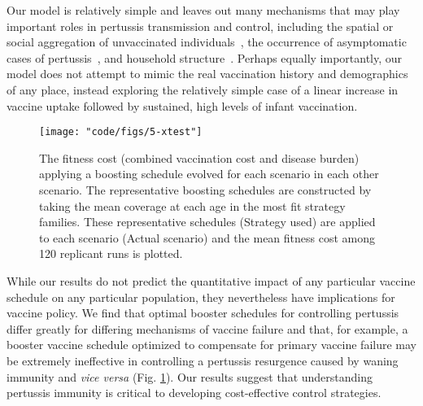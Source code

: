 \documentclass[12pt]{article}
\newcounter{lastnote}
\newenvironment{scilastnote}{%
\setcounter{lastnote}{\value{enumiv}}%
\addtocounter{lastnote}{+1}%
\begin{list}%
{\arabic{lastnote}.}
{\setlength{\leftmargin}{.22in}}
{\setlength{\labelsep}{.5em}}}
{\end{list}}
\begin{document}
Our model is relatively simple and leaves out many mechanisms
that may play important roles in pertussis transmission and control, including the
spatial or social aggregation of unvaccinated individuals~\cite{Omer:2009}, 
the occurrence of asymptomatic cases of pertussis~\cite{deGreeff_et:2010},
and household structure~\cite{deGreeff_et:2010}.
Perhaps equally importantly, our model does not attempt to mimic the real vaccination history and demographics
of any place, instead exploring the relatively simple case of a linear increase in vaccine uptake followed by sustained,
high levels of infant vaccination.


\begin{figure}[h!]
\texttt{[image: "code/figs/5-xtest"]}
\caption{\footnotesize The fitness cost (combined vaccination cost and disease burden)
applying a boosting schedule evolved for each scenario 
in each other scenario.
The representative boosting schedules are constructed by taking the mean coverage at each age
in the most fit strategy families. 
These representative schedules (Strategy used) are applied to each scenario (Actual scenario) and the mean fitness cost
among 120 replicant runs is plotted.
}

\label{fig:XTest}
\end{figure}

While our results do not predict the quantitative impact of any particular vaccine schedule on any particular population,
they nevertheless have implications for vaccine policy.
We find that optimal booster schedules for controlling pertussis differ 
greatly for differing mechanisms of vaccine failure and that,
for example, a booster vaccine schedule optimized to compensate for primary vaccine failure 
may be extremely ineffective in controlling a pertussis resurgence caused by 
waning immunity and \textit{vice versa} (Fig. \ref{fig:XTest}).
Our results suggest that understanding pertussis immunity 
is critical to developing cost-effective control strategies.









\end{document}
